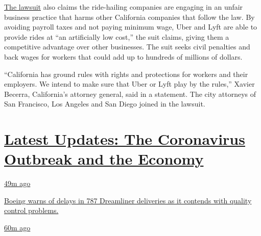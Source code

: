 \href{https://www.sfcityattorney.org/wp-content/uploads/2020/05/2020-05-05-Complaint-Filed.pdf}{The
lawsuit} also claims the ride-hailing companies are engaging in an
unfair business practice that harms other California companies that
follow the law. By avoiding payroll taxes and not paying minimum wage,
Uber and Lyft are able to provide rides at ``an artificially low cost,''
the suit claims, giving them a competitive advantage over other
businesses. The suit seeks civil penalties and back wages for workers
that could add up to hundreds of millions of dollars.

``California has ground rules with rights and protections for workers
and their employers. We intend to make sure that Uber or Lyft play by
the rules,'' Xavier Becerra, California's attorney general, said in a
statement. The city attorneys of San Francisco, Los Angeles and San
Diego joined in the lawsuit.

\hypertarget{latest-updates-the-coronavirus-outbreak-and-the-economy}{%
\section{\texorpdfstring{\href{https://www.nytimes3xbfgragh.onion/live/2020/09/08/business/stock-market-today-coronavirus?action=click\&pgtype=Article\&state=default\&region=MAIN_CONTENT_1\&context=storylines_live_updates}{Latest
Updates: The Coronavirus Outbreak and the
Economy}}{Latest Updates: The Coronavirus Outbreak and the Economy}}\label{latest-updates-the-coronavirus-outbreak-and-the-economy}}

\href{https://www.nytimes3xbfgragh.onion/live/2020/09/08/business/stock-market-today-coronavirus?action=click\&pgtype=Article\&state=default\&region=MAIN_CONTENT_1\&context=storylines_live_updates\#boeing-warns-of-delays-in-787-dreamliner-deliveries-as-it-contends-with-quality-control-problems}{49m
ago}

\href{https://www.nytimes3xbfgragh.onion/live/2020/09/08/business/stock-market-today-coronavirus?action=click\&pgtype=Article\&state=default\&region=MAIN_CONTENT_1\&context=storylines_live_updates\#boeing-warns-of-delays-in-787-dreamliner-deliveries-as-it-contends-with-quality-control-problems}{Boeing
warns of delays in 787 Dreamliner deliveries as it contends with quality
control problems.}

\href{https://www.nytimes3xbfgragh.onion/live/2020/09/08/business/stock-market-today-coronavirus?action=click\&pgtype=Article\&state=default\&region=MAIN_CONTENT_1\&context=storylines_live_updates\#oil-prices-fall-close-to-9-percent-this-whole-summer-of-bullishness-is-over}{60m
ago}

